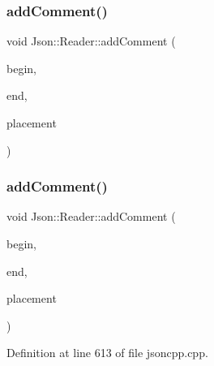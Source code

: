 \subsubsection{\texorpdfstring{add\+Comment()}{addComment()}\hspace{0.1cm}{\footnotesize\ttfamily [1/2]}}
{\footnotesize\ttfamily void Json\+::\+Reader\+::add\+Comment (\begin{DoxyParamCaption}\item[{\hyperlink{class_json_1_1_reader_a46795b5b272bf79a7730e406cb96375a}{Location}}]{begin,  }\item[{\hyperlink{class_json_1_1_reader_a46795b5b272bf79a7730e406cb96375a}{Location}}]{end,  }\item[{\hyperlink{namespace_json_a4fc417c23905b2ae9e2c47d197a45351}{Comment\+Placement}}]{placement }\end{DoxyParamCaption})\hspace{0.3cm}{\ttfamily [private]}}

\hypertarget{class_json_1_1_reader_aaea3bd62d12ffb6117a61476c0685049}{}\label{class_json_1_1_reader_aaea3bd62d12ffb6117a61476c0685049} 
\subsubsection{\texorpdfstring{add\+Comment()}{addComment()}\hspace{0.1cm}{\footnotesize\ttfamily [2/2]}}
{\footnotesize\ttfamily void Json\+::\+Reader\+::add\+Comment (\begin{DoxyParamCaption}\item[{\hyperlink{class_json_1_1_reader_a46795b5b272bf79a7730e406cb96375a}{Location}}]{begin,  }\item[{\hyperlink{class_json_1_1_reader_a46795b5b272bf79a7730e406cb96375a}{Location}}]{end,  }\item[{\hyperlink{namespace_json_a4fc417c23905b2ae9e2c47d197a45351}{Comment\+Placement}}]{placement }\end{DoxyParamCaption})\hspace{0.3cm}{\ttfamily [private]}}



Definition at line 613 of file jsoncpp.\+cpp.

\hypertarget{class_json_1_1_reader_af02176a1d2786b4415bbb00a1b10bb6b}{}\label{class_json_1_1_reader_af02176a1d2786b4415bbb00a1b10bb6b} 
